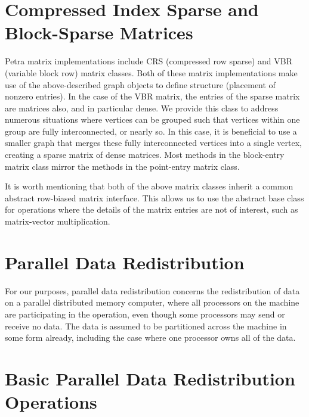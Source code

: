 \documentclass[12pt,relax]{PetraObjectModel}
\begin{document}
\section{Compressed Index Sparse and Block-Sparse Matrices}
Petra matrix implementations include CRS (compressed row sparse) and
VBR (variable block row) matrix classes. Both of these matrix implementations
make use of the above-described graph objects to define structure (placement
of nonzero entries). In the case of the VBR matrix, the entries of the sparse
matrix are matrices also, and in particular dense.  We provide this class
to address numerous situations where vertices can be grouped such that
vertices within one group are fully interconnected, or nearly so.  In this
case, it is beneficial to use a smaller graph that merges these fully
interconnected vertices into a single vertex, creating a sparse matrix of
dense matrices.  Most methods in the block-entry matrix class mirror the
methods in the point-entry matrix class.

It is worth mentioning that both of the above matrix classes inherit 
a common abstract row-biased matrix interface.  This allows us to use the
abstract base class for operations where the details of the matrix entries
are not of interest, such as matrix-vector multiplication.



\section{Parallel Data Redistribution}
For our purposes, parallel data redistribution concerns the redistribution of 
data on a parallel distributed memory computer, where all processors on the 
machine are participating in the operation, even though some processors may
send or receive no data.  The data is assumed to be partitioned across the
machine in some form already, including the case where one processor owns all
of the data.


\section{Basic Parallel Data Redistribution Operations}
\end{document}
